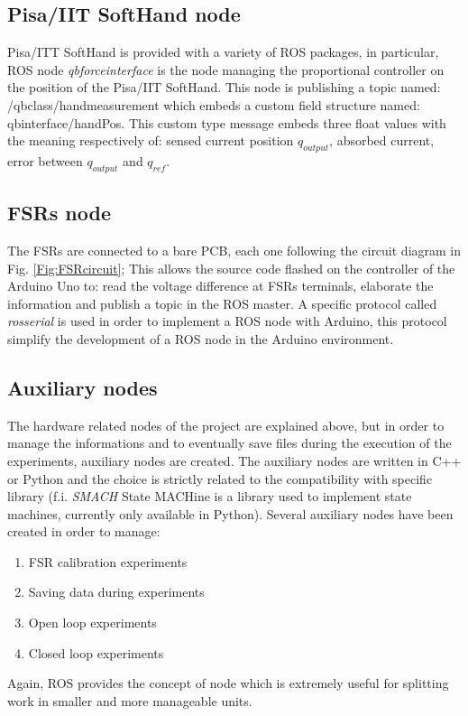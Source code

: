 \subsection{Pisa/IIT SoftHand node}
Pisa/ITT SoftHand is provided with a variety of ROS packages, in particular, ROS node \textit{qb\textunderscore force\textunderscore interface} is the node managing the proportional controller on the position of the Pisa/IIT SoftHand. This node is publishing a topic named: /qb\textunderscore class/hand\textunderscore measurement which embeds a custom field structure named: qb\textunderscore interface/handPos. This custom type message embeds three float values with the meaning respectively of: sensed current position $q_{output}$, absorbed current, error between $q_{output}$ and $q_{ref}$.

\subsection{FSRs node}
The FSRs are connected to a bare PCB, each one following the circuit diagram in Fig. \ref{Fig:FSRcircuit}; This allows the source code flashed on the controller of the Arduino Uno to: read the voltage difference at FSRs terminals, elaborate the information and publish a topic in the ROS master.
A specific protocol called \textit{rosserial} is used in order to implement a ROS node with Arduino, this protocol simplify the development of a ROS node in the Arduino environment.

\subsection{Auxiliary nodes}

The hardware related nodes of the project are explained above, but in order to manage the informations and to eventually save files during the execution of the experiments, auxiliary nodes are created.
The auxiliary nodes are written in C++ or Python and the choice is strictly related to the compatibility with specific library (f.i. \textit{SMACH} State MACHine is a library used to implement state machines, currently only available in Python).
Several auxiliary nodes have been created in order to manage:

\begin{enumerate}
\item FSR calibration experiments
\item Saving data during experiments
\item Open loop experiments
\item Closed loop experiments
\end{enumerate}
Again, ROS provides the concept of node which is extremely useful for splitting work in smaller and more manageable units.